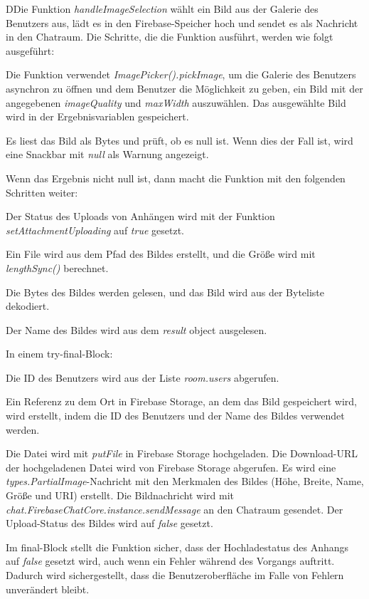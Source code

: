 DDie Funktion \textit{handleImageSelection} wählt ein Bild aus der Galerie des Benutzers aus, lädt es in den Firebase-Speicher hoch und sendet es als Nachricht in den Chatraum. Die Schritte, die die Funktion ausführt, werden wie folgt ausgeführt:

Die Funktion verwendet \textit{ImagePicker().pickImage}, um die Galerie des Benutzers asynchron zu öffnen und dem Benutzer die Möglichkeit zu geben, ein Bild mit der angegebenen \textit{imageQuality} und \textit{maxWidth} auszuwählen. Das ausgewählte Bild wird in der Ergebnisvariablen gespeichert.

Es liest das Bild als Bytes und prüft, ob es null ist. Wenn dies der Fall ist, wird eine Snackbar mit \textit{null} als Warnung angezeigt.

Wenn das Ergebnis nicht null ist, dann macht die Funktion mit den folgenden Schritten weiter:

Der Status des Uploads von Anhängen wird mit der Funktion \textit{setAttachmentUploading} auf \textit{true} gesetzt.

Ein File wird aus dem Pfad des Bildes erstellt, und die Größe wird mit \textit{lengthSync()} berechnet.

Die Bytes des Bildes werden gelesen, und das Bild wird aus der Byteliste dekodiert.

Der Name des Bildes wird aus dem \textit{result} object ausgelesen.

In einem try-final-Block:

Die ID des Benutzers wird aus der Liste \textit{room.users} abgerufen.

Ein Referenz zu dem Ort in Firebase Storage, an dem das Bild gespeichert wird, wird erstellt, indem die ID des Benutzers und der Name des Bildes verwendet werden.

Die Datei wird mit \textit{putFile} in Firebase Storage hochgeladen.
Die Download-URL der hochgeladenen Datei wird von Firebase Storage abgerufen.
Es wird eine \textit{types.PartialImage}-Nachricht mit den Merkmalen des Bildes (Höhe, Breite, Name, Größe und URI) erstellt.
Die Bildnachricht wird mit \textit{chat.FirebaseChatCore.instance.sendMessage} an den Chatraum gesendet.
Der Upload-Status des Bildes wird auf \textit{false} gesetzt.

Im final-Block stellt die Funktion sicher, dass der Hochladestatus des Anhangs auf \textit{false} gesetzt wird, auch wenn ein Fehler während des Vorgangs auftritt. Dadurch wird sichergestellt, dass die Benutzeroberfläche im Falle von Fehlern unverändert bleibt.

